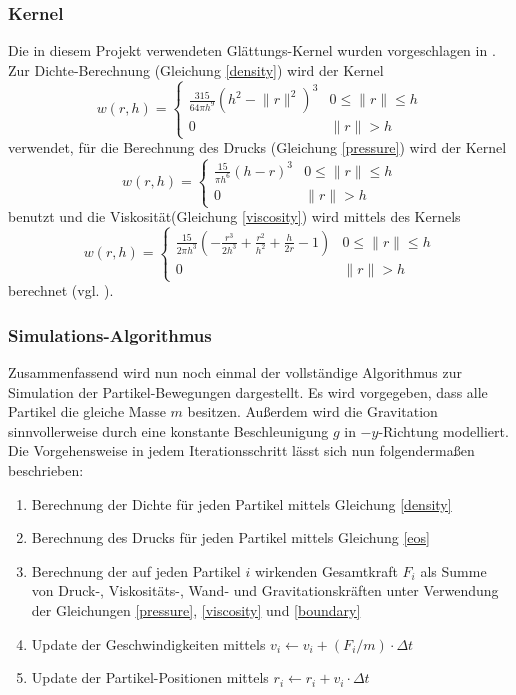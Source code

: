 \subsubsection*{Kernel}
Die in diesem Projekt verwendeten Glättungs-Kernel wurden vorgeschlagen in \cite{FluidSim}. Zur Dichte-Berechnung (Gleichung \ref{density}) wird der Kernel
\[
w(r,h) = \begin{cases}
\frac{315}{64\pi h^9} (h^2 - \lVert r \rVert^2)^3 & 0\leq \lVert r \rVert\leq h\\
0 & \lVert r \rVert > h
\end{cases}
\]
verwendet, für die Berechnung des Drucks (Gleichung \ref{pressure}) wird der Kernel
\[
w(r,h) = \begin{cases}
\frac{15}{\pi h^6} (h-r)^3 & 0\leq \lVert r \rVert\leq h\\
0 & \lVert r \rVert > h
\end{cases}
\]
benutzt und die Viskosität(Gleichung \ref{viscosity}) wird mittels des Kernels
\[
w(r,h) = \begin{cases}
\frac{15}{2\pi h^3} \left(-\frac{r^3}{2h^3} + \frac{r^2}{h^2} + \frac{h}{2r} - 1\right) & 0\leq \lVert r \rVert\leq h\\
0 & \lVert r \rVert > h
\end{cases}
\]
berechnet (vgl. \cite[S. 157]{FluidSim}).
\medskip

\subsubsection*{Simulations-Algorithmus}
Zusammenfassend wird nun noch einmal der vollständige Algorithmus zur Simulation der Partikel-Bewegungen dargestellt. Es wird vorgegeben, dass alle Partikel die gleiche Masse $m$ besitzen. Außerdem wird die Gravitation sinnvollerweise durch eine konstante Beschleunigung $g$ in $-y$-Richtung modelliert. Die Vorgehensweise in jedem Iterationsschritt lässt sich nun folgendermaßen beschrieben:
\begin{enumerate}
\item Berechnung der Dichte für jeden Partikel mittels Gleichung \ref{density}
\item Berechnung des Drucks für jeden Partikel mittels Gleichung \ref{eos}
\item Berechnung der auf jeden Partikel $i$ wirkenden Gesamtkraft $F_i$ als Summe von Druck-, Viskositäts-, Wand- und Gravitationskräften unter Verwendung der Gleichungen \ref{pressure}, \ref{viscosity} und \ref{boundary}
\item Update der Geschwindigkeiten mittels $v_i \leftarrow v_i + (F_i / m) \cdot \Delta t$
\item Update der Partikel-Positionen mittels $r_i \leftarrow r_i + v_i \cdot \Delta t$
\end{enumerate}






